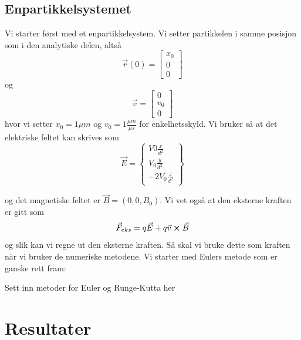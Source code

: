 \documentclass[reprint,english,notitlepage]{revtex4-1}  %
\begin{document}
\subsection*{Enpartikkelsystemet}
Vi starter først med et enpartikkelsystem. Vi setter partikkelen i samme posisjon som i den analytiske delen, altså
$$
\vec{r}(0)=\begin{bmatrix}
x_0 \\ 0 \\0
\end{bmatrix}
$$
og
$$
\vec{v}=\begin{bmatrix}
0\\v_0\\0
\end{bmatrix}
$$
hvor vi setter $x_0=1\mu m$ og $v_0=1\frac{\mu m}{\mu s}$ for enkelhetsskyld. Vi bruker så at det elektriske feltet kan skrives som
$$
\vec{E}=\begin{Bmatrix}
V0\frac{x}{d^2} \\V_0 \frac{y}{d^2}\\-2V_0 \frac{z}{d^2}
\end{Bmatrix}
$$

og det magnetiske feltet er $\vec{B}=(0,0,B_0)$. Vi vet også at den eksterne kraften er gitt som
$$
\vec{F}_{eks}=q\vec{E}+q\vec{v}\cross \vec{B}
$$
og slik kan vi regne ut den eksterne kraften.
Så skal vi bruke dette som kraften når vi bruker de numeriske metodene.
Vi starter med Eulers metode som er ganske rett fram:


Sett inn metoder for Euler og Runge-Kutta her




\section{Resultater}
\end{document}
